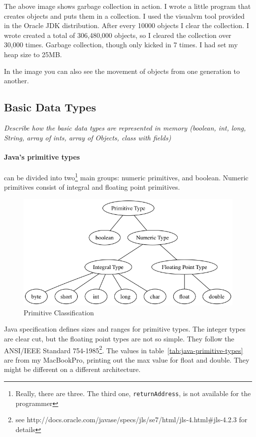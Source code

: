 The above image shows garbage collection in action. I wrote a little program that creates objects and puts them in a collection. I used the visualvm tool provided in the Oracle JDK distribution\cite{garbagecollection}. After every 10000 objects I clear the collection. I wrote created a total of 306,480,000 objects, so I cleared the collection over 30,000 times. Garbage collection, though only kicked in 7 times. I had set my heap size to 25MB. 

In the image you can also see the movement of objects from one generation to another.


\subsection{Basic Data Types}
\textit{Describe how the basic data types are represented in memory (boolean, int, long, String, array of ints, array of Objects, class with fields)}
\paragraph{Java's primitive types} can be divided into two\footnote{Really, there are three. The third one, \texttt{returnAddress}, is not available for the programmer} main groups: numeric primitives, and boolean. Numeric primitives consist of integral and floating point primitives.\cite{gosling}

\begin{figure}[H]\centering
\includegraphics[width=\linewidth]{primitives}
\caption{Primitive Classification}
\label{fig:results}
\end{figure}

Java specification\cite{gosling} defines sizes and ranges for primitive types. The integer types are clear cut, but the floating point types are not so simple. They follow the ANSI/IEEE Standard 754-1985\footnote{see http://docs.oracle.com/javase/specs/jls/se7/html/jls-4.html\#jls-4.2.3 for details}. The values in table~\ref{tab:java-primitive-types} are from my MacBookPro, printing out the max value for float and double. They might be different on a different architecture.

